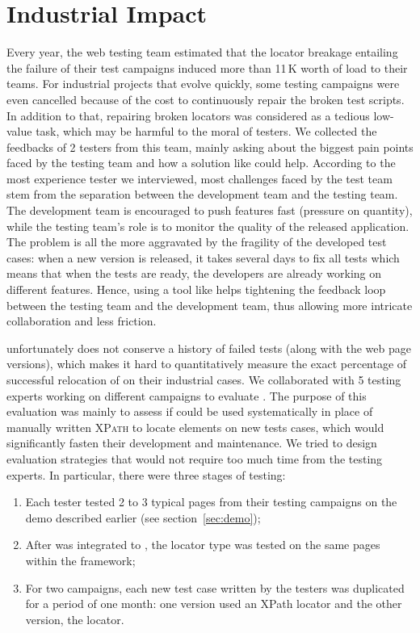 \documentclass[10pt,conference]{IEEEtran}
\begin{document}
\section{Industrial Impact}\label{sec:impact}
Every year, the \laredoute{} web testing team estimated that the locator breakage entailing the failure of their test campaigns induced more than 11\,K\texteuro{} worth of load to their teams.
For industrial projects that evolve quickly, some testing campaigns were even cancelled because of the cost to continuously repair the broken test scripts.
In addition to that, repairing broken locators was considered as a tedious low-value task, which may be harmful to the moral of testers. 
We collected the feedbacks of 2 testers from this team, mainly asking about the biggest pain points faced by the testing team and how a solution like \erratum could help. 
According to the most experience tester we interviewed, most challenges faced by the test team stem from the separation between the development team and the testing team.
The development team is encouraged to push features fast (pressure on quantity), while the testing team's role is to monitor the quality of the released application.
The problem is all the more aggravated by the fragility of the developed test cases: when a new version is released, it takes several days to fix all tests which means that when the tests are ready, the developers are already working on different features.
Hence, using a tool like \erratum helps tightening the feedback loop between the testing team and the development team, thus allowing more intricate collaboration and less friction.

\laredoute{} unfortunately does not conserve a history of failed tests (along with the web page versions), which makes it hard to quantitatively measure the exact percentage of successful relocation of \erratum on their industrial cases.
We collaborated with 5 testing experts working on different campaigns to evaluate \erratum. 
The purpose of this evaluation was mainly to assess if \erratum could be used systematically in place of manually written \textsc{XPath} to locate elements on new tests cases, which would significantly fasten their development and maintenance.
We tried to design evaluation strategies that would not require too much time from the testing experts.
In particular, there were three stages of testing:
\begin{enumerate}
    \item Each tester tested 2 to 3 typical pages from their testing campaigns on the demo described earlier (see section~\ref{sec:demo});
    \item After \erratum was integrated to \cerberus, the \erratum locator type was tested on the same pages within the \cerberus framework;
    \item For two campaigns, each new test case written by the testers was duplicated for a period of one month: one version used an XPath locator and the other version, the \erratum locator.
\end{enumerate}
\end{document}
